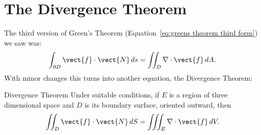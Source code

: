 \section{The Divergence Theorem}\label{sec:DivergenceTheorem}

The third version of Green's Theorem (Equation~\ref{eq:greens theorem third form}) we saw was:
$$\int_{\partial D} \vect{f}\cdot\vect{N}\,ds=\iint_{D} \nabla\cdot\vect{f}\,dA.$$ With minor changes this turns into another equation, the
Divergence Theorem:

\begin{theorem}{Divergence Theorem}{}
Under suitable conditions, if $E$ is a
region of three dimensional space and $D$ is its boundary surface,
oriented outward, then
$$\iint_{D} \vect{f}\cdot\vect{N}\,dS=\iiint_{E} \nabla\cdot\vect{f}\,dV.$$
\end{theorem}
\goodbreak
